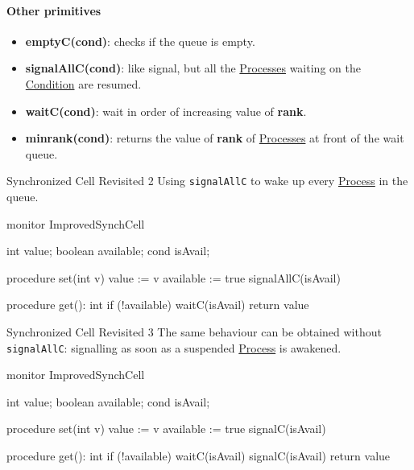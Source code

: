 \paragraph{Other primitives}\label{par:pi_cv_other_primitives} %
\begin{itemize}
    \item \textbf{emptyC(cond)}: checks if the queue is empty.
    \item \textbf{signalAllC(cond)}: like signal, but all the \hyperref[def:process]{Processes} waiting on the \hyperref[def:cond-vars]{Condition} are resumed.
    \item \textbf{waitC(cond)}: wait in order of increasing value of \textbf{rank}.
    \item \textbf{minrank(cond)}: returns the value of \textbf{rank} of \hyperref[def:process]{Processes} at front of the wait queue.
\end{itemize}
\begin{example}{Synchronized Cell Revisited 2}{}
    Using \texttt{signalAllC} to wake up every \hyperref[def:process]{Process} in the queue.
    \begin{codeblock}{}
    monitor ImprovedSynchCell {
        int value;
        boolean available;
        cond isAvail;

        procedure set(int v) {
            value := v
            available := true
            signalAllC(isAvail)
        }

        procedure get(): int {
            if (!available)
                waitC(isAvail)
            return value
        }
    }
    \end{codeblock}
\end{example}
\begin{example}{Synchronized Cell Revisited 3}{}
    The same behaviour can be obtained without \texttt{signalAllC}: signalling as soon as a suspended \hyperref[def:process]{Process} is awakened.
    \begin{codeblock}{}
    monitor ImprovedSynchCell {
        int value;
        boolean available;
        cond isAvail;

        procedure set(int v) {
            value := v
            available := true
            signalC(isAvail)
        }

        procedure get(): int {
            if (!available) {
                waitC(isAvail)
                signalC(isAvail)
            }
            return value
        }
    }
    \end{codeblock}
\end{example}
%
